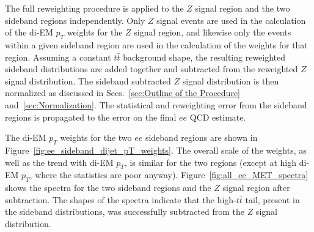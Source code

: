 \documentclass[dissertation.tex]{subfiles}
\begin{document}
The full reweighting procedure is applied to the $Z$ signal region and the two sideband regions independently.  Only $Z$ signal events are used in the calculation of the di-EM $p_{T}$ weights for the $Z$ signal region, and likewise only the events within a given sideband region are used in the calculation of the weights for that region.  Assuming a constant $t\bar{t}$ background shape, the resulting reweighted sideband \MET distributions are added together and subtracted from the reweighted $Z$ signal \MET distribution.  The sideband subtracted $Z$ signal \MET distribution is then normalized as discussed in Secs.~\ref{sec:Outline of the Procedure} and~\ref{sec:Normalization}.  The statistical and reweighting error from the sideband regions is propagated to the error on the final $ee$ QCD \MET estimate.

The di-EM $p_{T}$ weights for the two $ee$ sideband regions are shown in Figure~\ref{fig:ee_sideband_dijet_pT_weights}.  The overall scale of the weights, as well as the trend with di-EM $p_{T}$, is similar for the two regions (except at high di-EM $p_{T}$, where the statistics are poor anyway).  Figure~\ref{fig:all_ee_MET_spectra} shows the \MET spectra for the two sideband regions and the $Z$ signal region after subtraction.  The shapes of the spectra indicate that the high-\MET $t\bar{t}$ tail, present in the sideband distributions, was successfully subtracted from the $Z$ signal distribution.
\end{document}
